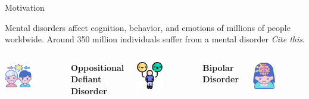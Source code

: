 \documentclass[spanish, aspectratio=169]{beamer}
\begin{document}
	
	
\frame{\titlepage}

\begin{frame}{Motivation}
	\begin{block}{}
		Mental disorders affect cognition, behavior, and emotions of millions of people worldwide. Around 350 million individuals suffer from a mental disorder \emph{Cite this}.
	\end{block}
	
	\begin{columns}[T,onlytextwidth]
		\centering
		\includegraphics[width=0.5\textwidth]{figures/OppositionalDefiantDisorder.png}
		
		\vspace{0.5em}
		\textbf{Oppositional Defiant Disorder}
		
		\centering
		\includegraphics[width=0.5\textwidth]{figures/BipolarDisorder.png}
		
		\vspace{0.5em}
		\textbf{Bipolar Disorder}
		
		\centering
		\includegraphics[width=0.5\textwidth]{figures/ADHD.png}
		

\end{columns}
\end{frame}
\end{document}
